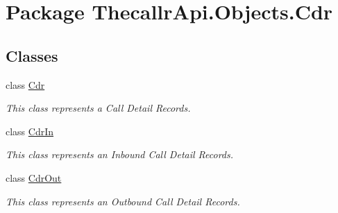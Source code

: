 \hypertarget{namespace_thecallr_api_1_1_objects_1_1_cdr}{\section{Package Thecallr\+Api.\+Objects.\+Cdr}
\label{namespace_thecallr_api_1_1_objects_1_1_cdr}
}
\subsection*{Classes}
\begin{DoxyCompactItemize}
\item 
class \hyperlink{class_thecallr_api_1_1_objects_1_1_cdr_1_1_cdr}{Cdr}
\begin{DoxyCompactList}\small\item\em This class represents a Call Detail Records. \end{DoxyCompactList}\item 
class \hyperlink{class_thecallr_api_1_1_objects_1_1_cdr_1_1_cdr_in}{Cdr\+In}
\begin{DoxyCompactList}\small\item\em This class represents an Inbound Call Detail Records. \end{DoxyCompactList}\item 
class \hyperlink{class_thecallr_api_1_1_objects_1_1_cdr_1_1_cdr_out}{Cdr\+Out}
\begin{DoxyCompactList}\small\item\em This class represents an Outbound Call Detail Records. \end{DoxyCompactList}\end{DoxyCompactItemize}
